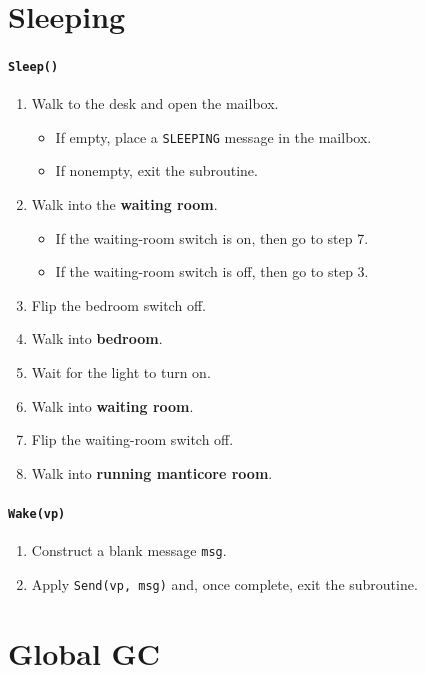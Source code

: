 \documentclass[11pt]{article}
\begin{document}
\section{Sleeping}

\paragraph{\texttt{Sleep()}}
\begin{enumerate}
  \item Walk to the desk and open the mailbox.
    \begin{itemize}
      \item If empty, place a \texttt{SLEEPING} message in the mailbox.
      \item If nonempty, exit the subroutine.
    \end{itemize}
  \item Walk into the \textbf{waiting room}.
    \begin{itemize}
      \item If the waiting-room switch is on, then go to step 7.
      \item If the waiting-room switch is off, then go to step 3.
    \end{itemize}
  \item Flip the bedroom switch off.
  \item Walk into \textbf{bedroom}.
  \item Wait for the light to turn on.
  \item Walk into \textbf{waiting room}.
  \item Flip the waiting-room switch off.
  \item Walk into \textbf{running manticore room}.
\end{enumerate}

\paragraph{\texttt{Wake(vp)}}

\begin{enumerate}
  \item Construct a blank message \texttt{msg}.
  \item Apply \texttt{Send(vp, msg)} and, once complete, exit the subroutine.
\end{enumerate}

\section{Global GC}
\end{document}
